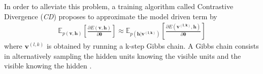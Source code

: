 \documentclass[letterpaper]{article}
\begin{document}
In order to alleviate this problem, a training algorithm called Contrastive Divergence (\textit{CD}) \cite{hinton2002training} proposes to approximate the model driven term by
\begin{equation}
\label{eq:grad_log_like}
\begin{split}
\mathbb{E}_{p(\bm{v} , \bm{h})} \left[ \frac{\partial E(\bm{v},\bm{h})}{\partial \bm{\theta}} \right]
\approx 
\mathbb{E}_{p(\bm{h} | \bm{v^{(l,k)}})} \left[ \frac{\partial E(\bm{v^{(l,k)}},\bm{h})}{\partial \bm{\theta}} \right]
\end{split}
\end{equation}
where $\bm{v}^{(l,k)}$ is obtained by running a k-step Gibbs chain. A Gibbs chain consists in alternatively sampling the hidden units knowing the visible units  and the visible knowing the hidden .
\end{document}
